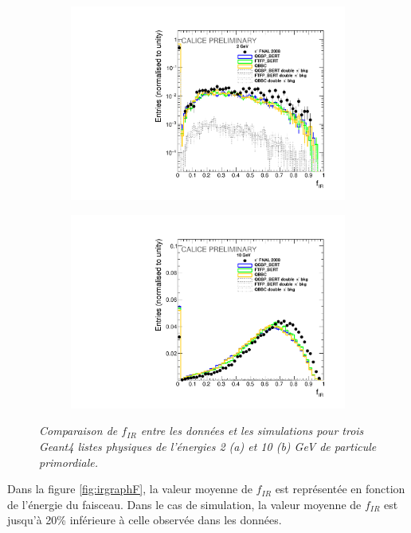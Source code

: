 \begin{figure}
	\centering
	\begin{subfigure}{0.5\textwidth}
		\centering
		\includegraphics[width=.90\linewidth]{ECAL/plots/e-ir-2.pdf}
		\caption{\label{fig:efr2F} }
	\end{subfigure}%
	\begin{subfigure}{0.5\textwidth}
		\centering
		\includegraphics[width=.90\linewidth]{ECAL/plots/e-ir-10.pdf}
		\caption{\label{fig:efr10F} }
	\end{subfigure}
	\caption{\label{fig:irexampleF} \sl%
		Comparaison de $f_{IR}$ entre les données et les simulations pour trois {\sc Geant}4  listes physiques de l'\'energies 2 (a) et 10 (b) GeV de particule primordiale.}
\end{figure}

Dans la figure \ref{fig:irgraphF}, la valeur moyenne de $f_ {IR}$ est représentée en fonction de l'énergie du faisceau.%
Dans le cas de simulation, la valeur moyenne de $f_{IR}$ est jusqu'à 20\% inférieure à celle observée dans les données.

